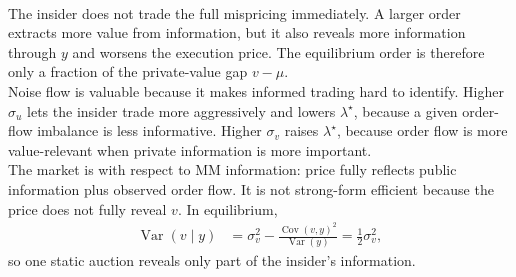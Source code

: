 \begin{model}
\par\smallskip\noindent{}\\
The insider does not trade the full mispricing immediately. A larger order extracts more value from information, but it also reveals more information through $y$ and worsens the execution price. The equilibrium order is therefore only a fraction of the private-value gap $v-\mu$.\\
Noise flow is valuable because it makes informed trading hard to identify. Higher $\sigma_u$ lets the insider trade more aggressively and lowers $\lambda^\star$, because a given order-flow imbalance is less informative. Higher $\sigma_v$ raises $\lambda^\star$, because order flow is more value-relevant when private information is more important.\\
The market is  with respect to MM information: price fully reflects public information plus observed order flow. It is not strong-form efficient because the price does not fully reveal $v$. In equilibrium,
\begin{align*}
\operatorname{Var}(v\mid y)&=\sigma_v^2-\frac{\operatorname{Cov}(v,y)^2}{\operatorname{Var}(y)}
=\frac{1}{2}\sigma_v^2,
\end{align*}
so one static auction reveals only part of the insider's information.


\end{model}
